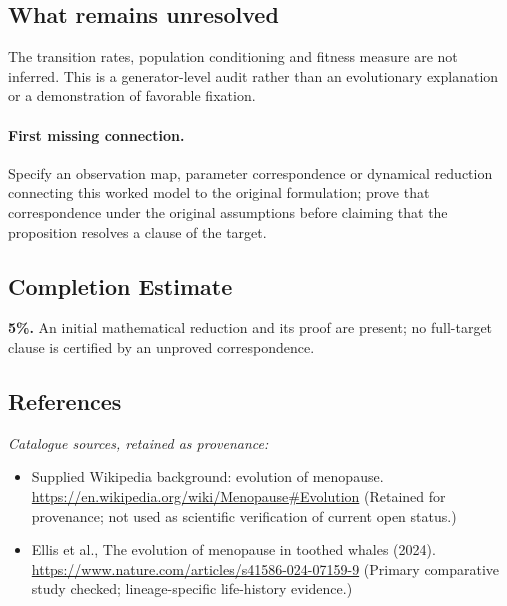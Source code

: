 \documentclass[11pt]{article}
\begin{document}
\subsection{What remains unresolved}
The transition rates, population conditioning and fitness measure are not inferred. This is a generator-level audit rather than an evolutionary explanation or a demonstration of favorable fixation.
\paragraph{First missing connection.} Specify an observation map, parameter correspondence or dynamical reduction connecting this worked model to the original formulation; prove that correspondence under the original assumptions before claiming that the proposition resolves a clause of the target.
\subsection{Completion Estimate}
\textbf{5\%.} An initial mathematical reduction and its proof are present; no full-target clause is certified by an unproved correspondence.
\subsection{References}
\noindent\emph{Catalogue sources, retained as provenance:}
\begin{itemize}
\item Supplied Wikipedia background: evolution of menopause. \url{https://en.wikipedia.org/wiki/Menopause#Evolution} (Retained for provenance; not used as scientific verification of current open status.)
\item Ellis et al., The evolution of menopause in toothed whales (2024). \url{https://www.nature.com/articles/s41586-024-07159-9} (Primary comparative study checked; lineage-specific life-history evidence.)
\end{itemize}
\clearpage


\appendix
\end{document}
